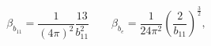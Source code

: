 \begin{equation}
\beta _{b_{11}}=\frac{1}{\left( 4\pi \right) ^{2}}\frac{13}{{b}_{11}^{2}}\qquad
\beta _{b_{e}}=\frac{1}{24\pi ^{2}}\left( 
\frac{2}{b_{11}}\right) ^{\frac{3}{2}},\label{beta}  
\end{equation}

